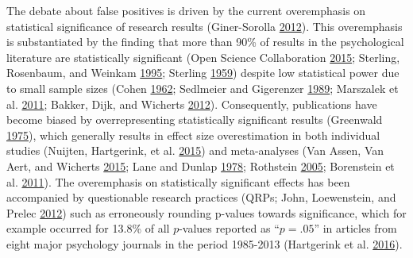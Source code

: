 \documentclass[a5paper]{book}
\begin{document}
The debate about false positives is driven by the current overemphasis
on statistical significance of research results (Giner-Sorolla
\protect\hyperlink{ref-doi:10.1177ux2f1745691612457576}{2012}). This
overemphasis is substantiated by the finding that more than 90\% of
results in the psychological literature are statistically significant
(Open Science Collaboration
\protect\hyperlink{ref-doi:10.1126ux2fscience.aac4716}{2015}; Sterling,
Rosenbaum, and Weinkam
\protect\hyperlink{ref-doi:10.2307ux2f2684823}{1995}; Sterling
\protect\hyperlink{ref-doi:10.2307ux2f2282137}{1959}) despite low
statistical power due to small sample sizes (Cohen
\protect\hyperlink{ref-doi:10.1037ux2fh0045186}{1962}; Sedlmeier and
Gigerenzer
\protect\hyperlink{ref-doi:10.1037ux2f0033-2909.105.2.309}{1989};
Marszalek et al.
\protect\hyperlink{ref-doi:10.2466ux2f03.11.pms.112.2.331-348}{2011};
Bakker, Dijk, and Wicherts
\protect\hyperlink{ref-doi:10.1177ux2f1745691612459060}{2012}).
Consequently, publications have become biased by overrepresenting
statistically significant results (Greenwald
\protect\hyperlink{ref-doi:10.1037ux2fh0076157}{1975}), which generally
results in effect size overestimation in both individual studies
(Nuijten, Hartgerink, et al.
\protect\hyperlink{ref-doi:10.3758ux2fs13428-015-0664-2}{2015}) and
meta-analyses (Van Assen, Van Aert, and Wicherts
\protect\hyperlink{ref-doi:10.1037ux2fmet0000025}{2015}; Lane and Dunlap
\protect\hyperlink{ref-doi:10.1111ux2fj.2044-8317.1978.tb00578.x}{1978};
Rothstein \protect\hyperlink{ref-isbn:9780470870150}{2005}; Borenstein
et al. \protect\hyperlink{ref-isbn:9781119964377}{2011}). The
overemphasis on statistically significant effects has been accompanied
by questionable research practices (QRPs; John, Loewenstein, and Prelec
\protect\hyperlink{ref-doi:10.1177ux2f0956797611430953}{2012}) such as
erroneously rounding p-values towards significance, which for example
occurred for 13.8\% of all \(p\)-values reported as \enquote{\(p =.05\)}
in articles from eight major psychology journals in the period 1985-2013
(Hartgerink et al.
\protect\hyperlink{ref-doi:10.7717ux2fpeerj.1935}{2016}).
\end{document}
